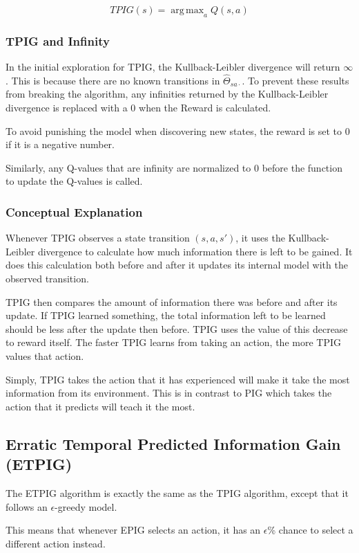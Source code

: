 \documentclass[12pt]{thesis}
\DeclareMathOperator*{\argmax}{arg\,max}
\begin{document}
\[ TPIG(s) = \argmax_a  Q(s,a)\]

\subsubsection{TPIG and Infinity}
In the initial exploration for TPIG, the Kullback-Leibler divergence will return $\infty$. This is because there are no known transitions in $\hat{\Theta}_{sa\cdot}$. To prevent these results from breaking the algorithm, any infinities returned by the Kullback-Leibler divergence is replaced with a 0 when the Reward is calculated.

To avoid punishing the model when discovering new states, the reward is set to 0 if it is a negative number.

Similarly, any Q-values that are infinity are normalized to 0 before the function to update the Q-values is called.

\subsubsection{Conceptual Explanation}
Whenever TPIG observes a state transition $(s,a,s')$, it uses the Kullback-Leibler divergence to calculate how much information there is left to be gained. It does this calculation both before and after it updates its internal model with the observed transition.

TPIG then compares the amount of information there was before and after its update. If TPIG learned something, the total information left to be learned should be less after the update then before. TPIG uses the value of this decrease to reward itself. The faster TPIG learns from taking an action, the more TPIG values that action.

Simply, TPIG takes the action that it has experienced will make it take the most information from its environment. This is in contrast to PIG which takes the action that it predicts will teach it the most.

\subsection{Erratic Temporal Predicted Information Gain (ETPIG)}
The ETPIG algorithm is exactly the same as the TPIG algorithm, except that it follows an $\epsilon$-greedy model.

This means that whenever EPIG selects an action, it has an $\epsilon$\% chance to select a different action instead.
\end{document}
